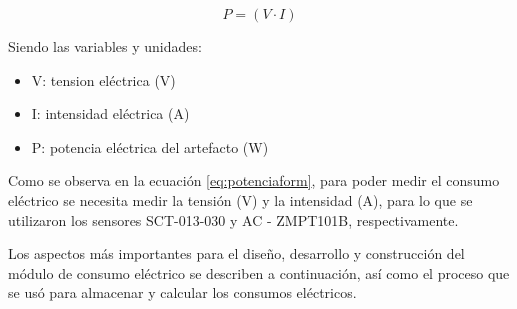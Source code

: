 \begin{equation}
	\label{eq:potenciaform}
	P = \left( V \cdot I \right)
\end{equation}

\vspace{0.2cm}
Siendo las variables y unidades:
\begin{itemize}
\item V: tension eléctrica (V)
\item I: intensidad eléctrica (A)
\item P: potencia eléctrica del artefacto (W)
\end{itemize}


Como se observa en la ecuación \ref{eq:potenciaform}, para poder medir el consumo eléctrico se necesita medir la tensión (V) y la intensidad (A), para lo que se utilizaron los sensores SCT-013-030 y  AC - ZMPT101B, respectivamente.

Los aspectos más importantes para el diseño, desarrollo y construcción del módulo de consumo eléctrico se describen  a continuación, así como el proceso que se usó para almacenar y calcular los consumos eléctricos.


